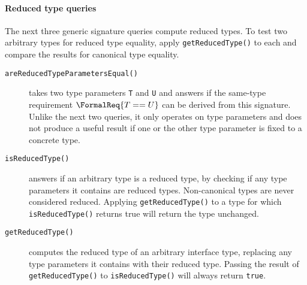 \documentclass[../generics]{subfiles}
\begin{document}
\paragraph{Reduced type queries}
The next three generic signature queries compute reduced types. To test two arbitrary types for reduced type equality, apply \texttt{getReducedType()} to each and compare the results for canonical type equality.
\begin{description}
\item [\texttt{areReducedTypeParametersEqual()}] takes two type parameters \texttt{T} and \texttt{U} and answers if the same-type requirement $\FormalReq{T == U}$ can be derived from this signature. Unlike the next two queries, it only operates on type parameters and does not produce a useful result if one or the other type parameter is fixed to a concrete type.

\item [\texttt{isReducedType()}] answers if an arbitrary type is a reduced type, by checking if any type parameters it contains are reduced types. Non-canonical types are never considered reduced. Applying \texttt{getReducedType()} to a type for which \texttt{isReducedType()} returns true will return the type unchanged.

\item [\texttt{getReducedType()}] computes the reduced type of an arbitrary interface type, replacing any type parameters it contains with their reduced type. Passing the result of \texttt{getReducedType()} to \texttt{isReducedType()} will always return \texttt{true}.
\end{description}
\end{document}
